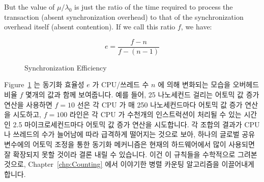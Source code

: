 But the value of $\mu / \lambda_0$ is just the ratio of the time required
to process the transaction (absent synchronization overhead) to that of 
the synchronization overhead itself (absent contention).
If we call this ratio $f$, we have:
\fi

\begin{equation}
	e = \frac{f - n}{f - (n - 1)}
\end{equation}

\begin{figure}[tbp]
\begin{center}
\end{center}
\caption{Synchronization Efficiency}
\label{fig:SMPdesign:Synchronization Efficiency}
\end{figure}

Figure~\ref{fig:SMPdesign:Synchronization Efficiency} 는 동기화 효율성 $e$ 가
CPU/쓰레드 수 $n$ 에 의해 변화되는 모습을 오버헤드 비율 $f$ 몇개의 값과 함께
보여줍니다.
예를 들어, 25 나노세컨드 걸리는 어토믹 값 증가 연산을 사용하면 $f=10$ 선은 각
CPU 가 매 250 나노세컨드마다 어토믹 값 증가 연산을 시도하고, $f=100$ 라인은 각
CPU 가 수천개의 인스트럭션이 처리될 수 있는 시간인 2.5 마이크로세컨드마다
어토믹 값 증가 연산을 시도합니다.
각 조합의 결과가 CPU 나 쓰레드의 수가 늘어남에 따라 급격하게 떨어지는 것으로
보아, 하나의 글로벌 공유 변수에의 어토믹 조정을 통한 동기화 메커니즘은 현재의
하드웨어에서 많이 사용되면 잘 확장되지 못할 것이라 결론 내릴 수 있습니다.
이건 이 규칙들을 수학적으로 그려본 것으로, Chapter~\ref{chp:Counting} 에서
이야기한 병렬 카운팅 알고리즘을 이끌어내게 합니다.
\iffalse

